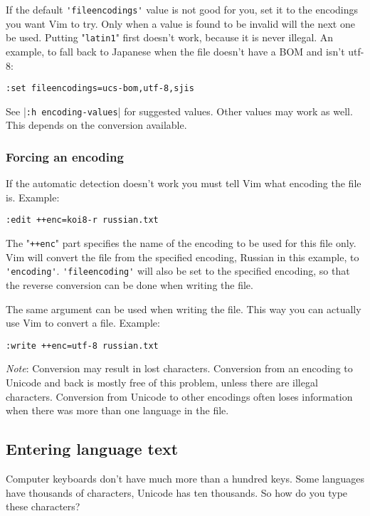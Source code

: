 If the default \verb!'fileencodings'! value is not good for you, set it to the encodings you want Vim to try.
Only when a value is found to be invalid will the next one be used.
Putting "\verb!latin1!" first doesn't work, because it is never illegal.
An example, to fall back to Japanese when the file doesn't have a BOM and isn't utf-8:

\begin{Verbatim}[samepage=true]
 :set fileencodings=ucs-bom,utf-8,sjis
\end{Verbatim}

See |\verb!:h encoding-values!| for suggested values.
Other values may work as well.
This depends on the conversion available.

\subsubsection{Forcing an encoding}
If the automatic detection doesn't work you must tell Vim what encoding the file is.
Example:

\begin{Verbatim}[samepage=true]
 :edit ++enc=koi8-r russian.txt
\end{Verbatim}

The "\verb!++enc!" part specifies the name of the encoding to be used for this file only.
Vim will convert the file from the specified encoding, Russian in this example, to \verb!'encoding'!.
\verb!'fileencoding'! will also be set to the specified encoding, so that the reverse conversion can be done when writing the file.

The same argument can be used when writing the file.
This way you can actually use Vim to convert a file.
Example:

\begin{Verbatim}[samepage=true]
 :write ++enc=utf-8 russian.txt
\end{Verbatim}
 
\emph{Note}: Conversion may result in lost characters.
Conversion from an encoding to Unicode and back is mostly free of this problem, unless there are illegal characters.
Conversion from Unicode to other encodings often loses information when there was more than one language in the file.
\subsection{Entering language text}
\label{Entering language text}
Computer keyboards don't have much more than a hundred keys.
Some languages have thousands of characters, Unicode has ten thousands.
So how do you type these characters?

